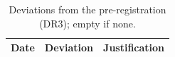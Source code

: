\begin{table}
\caption{Deviations from the pre-registration (DR3); empty if none.}
\begin{tabular}{lll}
\toprule
Date & Deviation & Justification \\
\midrule
\bottomrule
\end{tabular}
\end{table}
